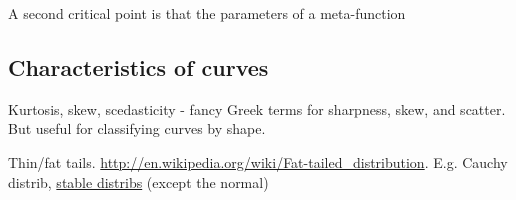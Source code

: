 \begin{remark}
  A second critical point is that the parameters of a meta-function
\end{remark}

\subsection{Characteristics of curves}

Kurtosis, skew, scedasticity - fancy Greek terms for sharpness, skew,
and scatter.  But useful for classifying curves by shape.

Thin/fat tails.
\url{http://en.wikipedia.org/wiki/Fat-tailed_distribution}.
E.g. Cauchy distrib,
\href{http://en.wikipedia.org/wiki/Stable_distributions}{stable
  distribs} (except the normal)

